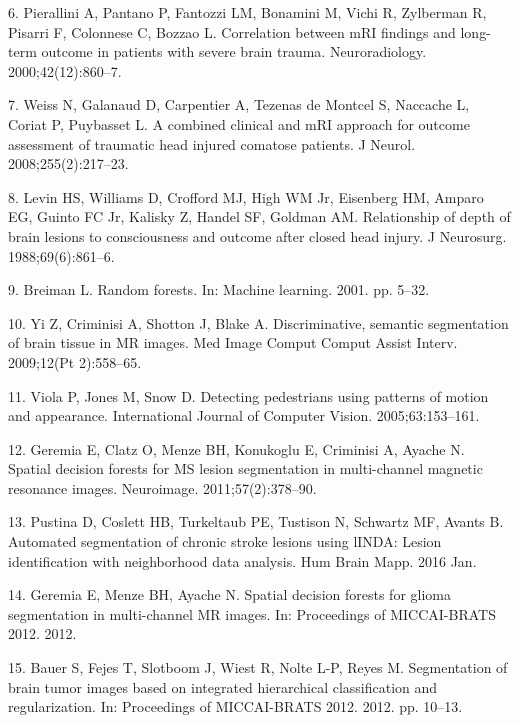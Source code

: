 \documentclass[11pt,]{article}
\begin{document}
\hypertarget{ref-Pierallini:2000aa}{}
6. Pierallini A, Pantano P, Fantozzi LM, Bonamini M, Vichi R, Zylberman
R, Pisarri F, Colonnese C, Bozzao L. Correlation between mRI findings
and long-term outcome in patients with severe brain trauma.
Neuroradiology. 2000;42(12):860--7.

\hypertarget{ref-Weiss:2008aa}{}
7. Weiss N, Galanaud D, Carpentier A, Tezenas de Montcel S, Naccache L,
Coriat P, Puybasset L. A combined clinical and mRI approach for outcome
assessment of traumatic head injured comatose patients. J Neurol.
2008;255(2):217--23.

\hypertarget{ref-Levin:1988aa}{}
8. Levin HS, Williams D, Crofford MJ, High WM Jr, Eisenberg HM, Amparo
EG, Guinto FC Jr, Kalisky Z, Handel SF, Goldman AM. Relationship of
depth of brain lesions to consciousness and outcome after closed head
injury. J Neurosurg. 1988;69(6):861--6.

\hypertarget{ref-breiman2001}{}
9. Breiman L. Random forests. In: Machine learning. 2001. pp. 5--32.

\hypertarget{ref-yi2009}{}
10. Yi Z, Criminisi A, Shotton J, Blake A. Discriminative, semantic
segmentation of brain tissue in MR images. Med Image Comput Comput
Assist Interv. 2009;12(Pt 2):558--65.

\hypertarget{ref-viola2005}{}
11. Viola P, Jones M, Snow D. Detecting pedestrians using patterns of
motion and appearance. International Journal of Computer Vision.
2005;63:153--161.

\hypertarget{ref-geremia2011}{}
12. Geremia E, Clatz O, Menze BH, Konukoglu E, Criminisi A, Ayache N.
Spatial decision forests for MS lesion segmentation in multi-channel
magnetic resonance images. Neuroimage. 2011;57(2):378--90.

\hypertarget{ref-Pustina:2016aa}{}
13. Pustina D, Coslett HB, Turkeltaub PE, Tustison N, Schwartz MF,
Avants B. Automated segmentation of chronic stroke lesions using lINDA:
Lesion identification with neighborhood data analysis. Hum Brain Mapp.
2016 Jan.

\hypertarget{ref-geremia2012}{}
14. Geremia E, Menze BH, Ayache N. Spatial decision forests for glioma
segmentation in multi-channel MR images. In: Proceedings of MICCAI-BRATS
2012. 2012.

\hypertarget{ref-bauer2012}{}
15. Bauer S, Fejes T, Slotboom J, Wiest R, Nolte L-P, Reyes M.
Segmentation of brain tumor images based on integrated hierarchical
classification and regularization. In: Proceedings of MICCAI-BRATS 2012.
2012. pp. 10--13.
\end{document}
